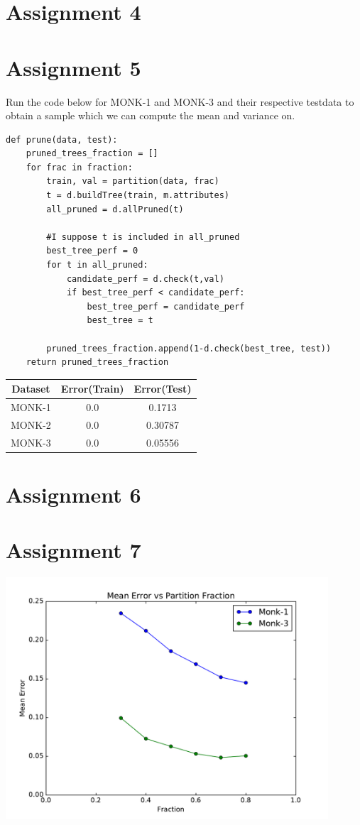 \documentclass{article}
\begin{document}
\section*{Assignment 4}

\section*{Assignment 5}


Run the code below for MONK-1 and MONK-3 and their respective testdata to obtain a sample which we can 
compute the mean and variance on.

\begin{lstlisting}
def prune(data, test):
	pruned_trees_fraction = []
	for frac in fraction:
		train, val = partition(data, frac)
		t = d.buildTree(train, m.attributes)
		all_pruned = d.allPruned(t)
		
		#I suppose t is included in all_pruned
		best_tree_perf = 0
		for t in all_pruned:
			candidate_perf = d.check(t,val)
			if best_tree_perf < candidate_perf:
				best_tree_perf = candidate_perf
				best_tree = t
		
		pruned_trees_fraction.append(1-d.check(best_tree, test))
	return pruned_trees_fraction
\end{lstlisting}


\begin{center}
 \begin{tabular}{|c | c | c |} 
 \hline
 Dataset & Error(Train) &  Error(Test) \\ [0.5ex] 
 \hline \hline
 MONK-1 & 0.0 & 0.1713 \\ 
 MONK-2 & 0.0 & 0.30787 \\ 
 MONK-3 & 0.0 & 0.05556  \\ [1ex] 
 \hline
\end{tabular}
\end{center}


\section*{Assignment 6}

\section*{Assignment 7}

\includegraphics[width = 12cm]{figure_1.pdf}
\end{document}
